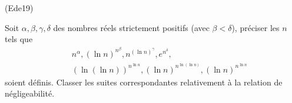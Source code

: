 \begin{tiny}(Ede19)\end{tiny} Soit $\alpha ,\beta ,\gamma ,\delta $ des nombres r{\'e}els strictement positifs (avec $\beta < \delta $), pr{\'e}ciser les $n$ tels que
\begin{eqnarray*}
&&n^{\alpha },(\ln n)^{n^{\beta }},n^{(\ln n)^{\gamma }},e^{n^{\delta }}, \\
&&(\ln (\ln n))^{n^{\ln n}},(\ln n)^{n^{\ln (\ln n)}},(\ln
n)^{n^{\ln n}}
\end{eqnarray*}
soient d{\'e}finis. Classer les suites correspondantes relativement {\`a} la relation de n{\'e}gligeabilit{\'e}.